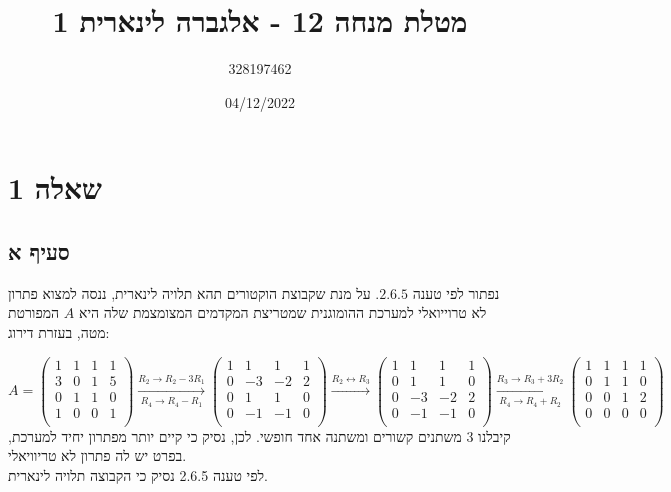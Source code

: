 \documentclass{article}
\title{מטלת מנחה 12 - אלגברה לינארית 1}
\author{328197462}
\date{04/12/2022}
\begin{document}
\maketitle

\section*{שאלה 1}

\subsection*{סעיף א}
נפתור לפי טענה $2.6.5$. על מנת שקבוצת הוקטורים תהא תלויה לינארית,
ננסה למצוא פתרון לא טרוייואלי למערכת ההומוגנית שמטריצת המקדמים המצומצמת שלה היא $A$ המפורטת מטה, בעזרת דירוג:

\[
    A = \begin{pmatrix}
        1 & 1 & 1 & 1 \\
        3 & 0 & 1 & 5 \\
        0 & 1 & 1 & 0 \\
        1 & 0 & 0 & 1 \\
    \end{pmatrix}
    \xrightarrow[R_4\rightarrow R_4-R_1]{R_2\rightarrow R_2-3R_1}
    \begin{pmatrix}
        1 & 1  & 1  & 1 \\
        0 & -3 & -2 & 2 \\
        0 & 1  & 1  & 0 \\
        0 & -1 & -1 & 0 \\
    \end{pmatrix}
    \xrightarrow{R_2\leftrightarrow R_3}
    \begin{pmatrix}
        1 & 1  & 1  & 1 \\
        0 & 1  & 1  & 0 \\
        0 & -3 & -2 & 2 \\
        0 & -1 & -1 & 0 \\
    \end{pmatrix}
    \xrightarrow[R_4\rightarrow R_4+R_2]{R_3\rightarrow R_3+3R_2}
    \begin{pmatrix}
        1 & 1 & 1 & 1 \\
        0 & 1 & 1 & 0 \\
        0 & 0 & 1 & 2 \\
        0 & 0 & 0 & 0 \\
    \end{pmatrix}
\]
קיבלנו 3 משתנים קשורים ומשתנה אחד חופשי. לכן, נסיק כי קיים יותר מפתרון יחיד למערכת, בפרט יש לה פתרון לא טריוויאלי. \\
לפי טענה 2.6.5 נסיק כי הקבוצה תלויה לינארית.
\end{document}
